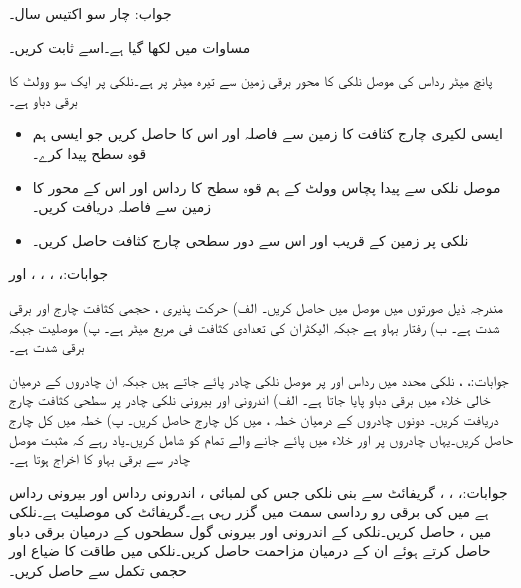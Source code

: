 جواب: چار سو اکتیس  سال۔ 

مساوات  میں   لکھا گیا ہے۔اسے ثابت کریں۔

پانچ میٹر رداس کی موصل نلکی کا محور برقی زمین سے تیرہ میٹر پر ہے۔نلکی پر ایک سو وولٹ کا برقی دباو ہے۔
\begin{itemize}
\item
ایسی لکیری چارج کثافت کا زمین سے فاصلہ اور اس کا  حاصل کریں جو ایسی ہم قوہ سطح  پیدا کرے۔
\item
موصل نلکی سے پیدا پچاس وولٹ کے ہم قوہ سطح کا رداس اور اس کے محور کا زمین سے فاصلہ دریافت کریں۔
\item
نلکی پر زمین کے قریب اور اس سے دور سطحی چارج کثافت حاصل کریں۔
\end{itemize} 

جوابات:، ، ، ،  اور 

مندرجہ ذیل صورتوں میں موصل میں  حاصل کریں۔ الف) حرکت پذیری ، حجمی کثافت چارج  اور برقی شدت  ہے۔ ب) رفتار بہاو  ہے جبکہ الیکٹران کی تعدادی کثافت  فی مربع میٹر ہے۔ پ) موصلیت  جبکہ برقی شدت  ہے۔

جوابات:، ، 
نلکی محدد میں رداس  اور  پر موصل نلکی چادر پائے جاتے ہیں جبکہ ان چادروں کے درمیان خالی خلاء میں  برقی دباو پایا جاتا ہے۔ الف) اندرونی اور بیرونی نلکی چادر پر سطحی کثافت چارج دریافت کریں۔ دونوں چادروں کے درمیان خطہ ،  میں کل چارج حاصل کریں۔ پ) خطہ  میں کل چارج حاصل کریں۔یہاں چادروں پر اور خلاء میں پائے جانے والے تمام کو شامل کریں۔یاد رہے کہ مثبت موصل چادر سے برقی بہاو کا اخراج ہوتا ہے۔

جوابات:، ، ، 
گریفائٹ سے بنی  نلکی جس کی لمبائی ، اندرونی رداس  اور بیرونی رداس  ہے میں  کی برقی رو رداسی سمت میں  گزر رہی ہے۔گریفائٹ  کی موصلیت  ہے۔نلکی میں ،  حاصل کریں۔نلکی کے اندرونی اور بیرونی گول سطحوں کے درمیان برقی دباو  حاصل کرتے ہوئے ان کے درمیان مزاحمت  حاصل کریں۔نلکی میں طاقت کا ضیاع  اور حجمی تکمل  سے حاصل کریں۔

